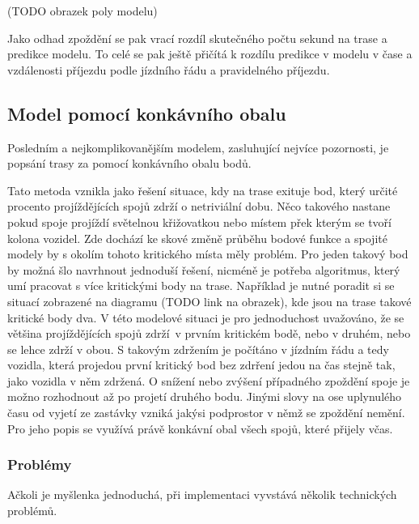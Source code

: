 (TODO obrazek poly modelu)

\bigbreak

Jako odhad zpoždění se pak vrací rozdíl skutečného počtu sekund na trase a predikce modelu. To celé se pak ještě přičítá k rozdílu predikce v modelu v čase a vzdálenosti příjezdu podle jízdního řádu a pravidelného příjezdu.


\subsection{Model pomocí konkávního obalu}

Posledním a nejkomplikovanějším modelem, zasluhující nejvíce pozornosti, je popsání trasy za pomocí konkávního obalu bodů.

\bigbreak

Tato metoda vznikla jako řešení situace, kdy na trase exituje bod, který určité procento projíždějících spojů zdrží o netriviální dobu. Něco takového nastane pokud spoje projíždí světelnou křižovatkou nebo místem přek kterým se tvoří kolona vozidel. Zde dochází ke skové změně průběhu bodové funkce a spojité modely by s okolím tohoto kritického místa měly problém. Pro jeden takový bod by možná šlo navrhnout jednoduší řešení, nicméně je potřeba algoritmus, který umí pracovat s více kritickými body na trase. Například je nutné poradit si se situací zobrazené na diagramu (TODO link na obrazek), kde jsou na trase takové kritické body dva. V této modelové situaci je pro jednoduchost uvažováno, že se většina projíždějících spojů zdrží v prvním kritickém bodě, nebo v druhém, nebo se lehce zdrží v obou. S takovým zdržením je počítáno v jízdním řádu a tedy vozidla, která projedou první kritický bod bez zdrření jedou na čas stejně tak, jako vozidla v něm zdržená. O snížení nebo zvýšení případného zpoždění spoje je možno rozhodnout až po projetí druhého bodu. Jinými slovy na ose uplynulého času od vyjetí ze zastávky vzniká jakýsi podprostor v němž se zpoždění nemění. Pro jeho popis se využívá právě konkávní obal všech spojů, které přijely včas.


\subsubsection{Problémy}

Ačkoli je myšlenka jednoduchá, při implementaci vyvstává několik technických problémů.

\bigbreak

